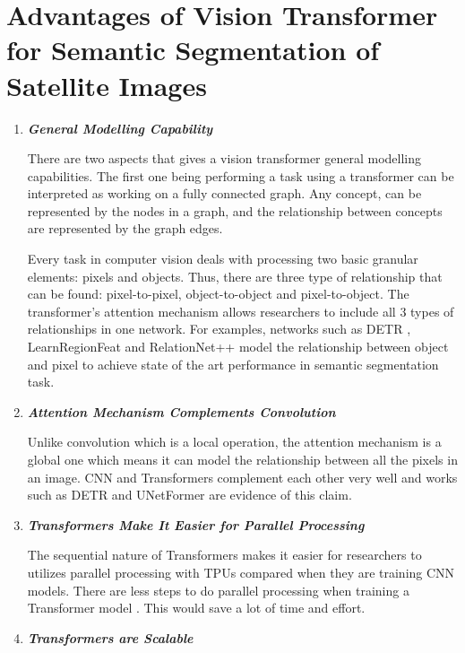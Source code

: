 \section{Advantages of Vision Transformer for Semantic Segmentation of Satellite Images}
\begin{enumerate}
    \item \textit{\textbf{General Modelling Capability}}
    
    There are two aspects that gives a vision transformer general modelling capabilities. The first one being performing a task using a transformer can be interpreted as working on a fully connected graph. Any concept, can be represented by the nodes in a graph, and the relationship between concepts are represented by the graph edges.

    Every task in computer vision deals with processing two basic granular elements: pixels and objects. Thus, there are three type of relationship that can be found: pixel-to-pixel, object-to-object and pixel-to-object. The transformer's attention mechanism allows researchers to include all 3 types of relationships in one network. For examples, networks such as DETR \cite{detr}, LearnRegionFeat \cite{learnregionfeat} and RelationNet++ \cite{regionnet++} model the relationship between object and pixel to achieve state of the art performance in semantic segmentation task.  

    \item \textit{\textbf{Attention Mechanism Complements Convolution}}

    Unlike convolution which is a local operation, the attention mechanism is a global one which means it can model the relationship between all the pixels in an image. CNN and Transformers complement each other very well and works such as DETR \cite{detr} and UNetFormer \cite{unetformer} are evidence of this claim.

    \item \textit{\textbf{Transformers Make It Easier for Parallel Processing}}

        The sequential nature of Transformers makes it easier for researchers to utilizes parallel processing with TPUs compared when they are training CNN models. There are less steps to do parallel processing when training a Transformer model \cite{swin-v1}. This would save a lot of time and effort.


    \item \textit{\textbf{Transformers are Scalable}}


\end{enumerate}

